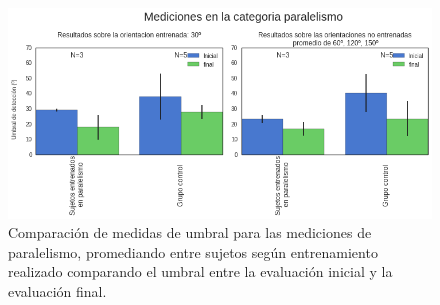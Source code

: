 \documentclass{article}
\numberwithin{figure}{section}
\begin{document}

    
    \begin{figure}
        \center
        \includegraphics[width=\textwidth]{Imagenes/TransferenciaParalelismoBarras.png}
        \caption{Comparación de medidas de umbral para las mediciones de paralelismo, promediando entre sujetos según entrenamiento realizado comparando el umbral entre la evaluación inicial y la evaluación final.}
        \label{fig:TransferenciaParalelismoBarras}
    \end{figure}  
\end{document}

